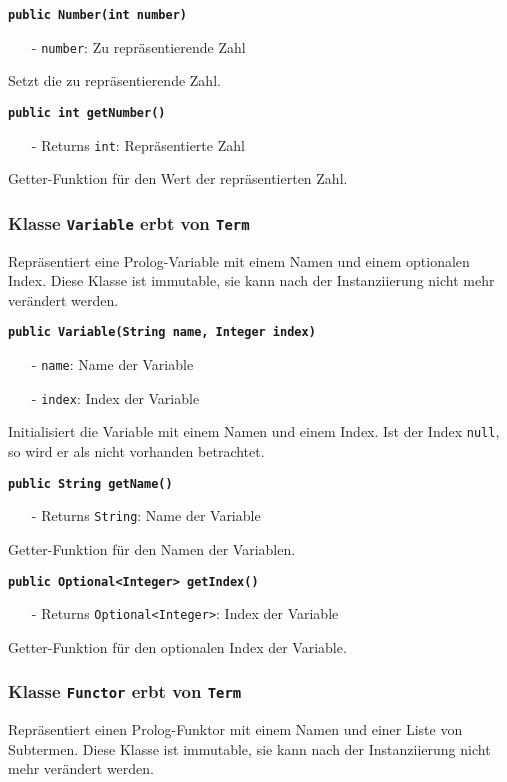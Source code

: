 \documentclass[parskip=full,11pt,twoside]{scrartcl}
\begin{document}
\textbf{\texttt{public Number(int number)}}
\begin{itemize}[noitemsep]
	\item[-] \texttt{number}: Zu repräsentierende Zahl
\end{itemize}
Setzt die zu repräsentierende Zahl.

\textbf{\texttt{public int getNumber()}}
\begin{itemize}[noitemsep]
	\item[-] Returns \texttt{int}: Repräsentierte Zahl
\end{itemize}
Getter-Funktion für den Wert der repräsentierten Zahl.

\subsubsection{Klasse \texttt{Variable} erbt von \texttt{Term}}
Repräsentiert eine Prolog-Variable mit einem Namen und einem optionalen Index. Diese Klasse ist immutable, sie kann nach der Instanziierung nicht mehr verändert werden.

\textbf{\texttt{public Variable(String name, Integer index)}}
\begin{itemize}[noitemsep]
	\item[-] \texttt{name}: Name der Variable
	\item[-] \texttt{index}: Index der Variable
\end{itemize}
Initialisiert die Variable mit einem Namen und einem Index. Ist der Index \texttt{null}, so wird er als nicht vorhanden betrachtet.

\textbf{\texttt{public String getName()}}
\begin{itemize}[noitemsep]
	\item[-] Returns \texttt{String}: Name der Variable
\end{itemize}
Getter-Funktion für den Namen der Variablen.

\textbf{\texttt{public Optional<Integer> getIndex()}}
\begin{itemize}[noitemsep]
	\item[-] Returns \texttt{Optional<Integer>}: Index der Variable
\end{itemize}
Getter-Funktion für den optionalen Index der Variable.

\subsubsection{Klasse \texttt{Functor} erbt von \texttt{Term}}
Repräsentiert einen Prolog-Funktor mit einem Namen und einer Liste von Subtermen. Diese Klasse ist immutable, sie kann nach der Instanziierung nicht mehr verändert werden.
\end{document}
